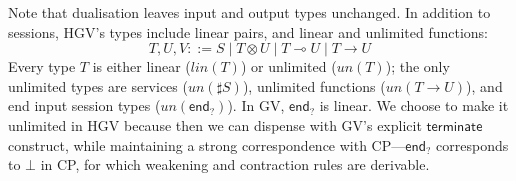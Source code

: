 \documentclass{easychair}
\newcommand{\key}{\mathsf}
\newcommand{\gvEndInput}{\key{end}_?}
\newcommand{\gvService}[1]{\sharp {#1}}
\newcommand{\lolli}{\multimap}
\newcommand{\gvLinFun}[2]{{#1} \lolli {#2}}
\newcommand{\gvUnFun}[2]{{#1} \to {#2}}
\newcommand{\gvTimes}[2]{{#1} \otimes {#2}}
\newcommand{\cpBottom}{\bot}
\newcommand{\un}[1]{\mathit{un}(#1)}
\newcommand{\lin}[1]{\mathit{lin}(#1)}
\newcommand{\hgv}{HGV\xspace}
\begin{document}
Note that dualisation leaves input and output types unchanged.  In addition to sessions, \hgv's
types include linear pairs, and linear and unlimited functions:
\[
T,U,V ::= S \mid \gvTimes{T}{U} \mid \gvLinFun{T}{U} \mid \gvUnFun{T}{U}
\]
%
Every type $T$ is either linear ($\lin{T}$) or unlimited ($\un{T}$); the only unlimited types are
services ($\un{\gvService{S}}$), unlimited functions ($\un{\gvUnFun{T}{U}}$), and end input session
types ($\un{\gvEndInput}$).
%
In GV, $\gvEndInput$ is linear. We choose to make it unlimited in \hgv because then we can dispense
with GV's explicit $\key{terminate}$ construct,
while maintaining a strong correspondence with CP---$\gvEndInput$ corresponds to $\cpBottom$ in CP,
for which weakening and contraction rules are derivable.
\end{document}
